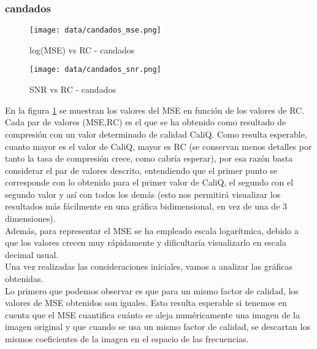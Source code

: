 \documentclass[12pt,a4paper]{article}
\begin{document}
\subsubsection{candados}
\hspace*{-2.5em}
\begin{minipage}{0.5\textwidth}
        \centering
        \begin{figure}[H]
        \centering
        \texttt{[image: data/candados\_mse.png]}
        \caption{log(MSE) vs RC - candados}
        \label{cand-mse}
        \end{figure}
        \end{minipage}\hfill
        \begin{minipage}{0.5\textwidth}
         \begin{figure}[H]
        \centering
        \texttt{[image: data/candados\_snr.png]}
        \caption{SNR vs RC - candados}
        \label{cand-snr}
        
        \end{figure}  
\end{minipage}

\vspace{2em}
En la figura \ref{cand-mse} se muestran los valores del MSE en función de los valores de RC. Cada par de valores (MSE,RC) es el que se ha obtenido como resultado de compresión con un valor determinado de calidad CaliQ. Como resulta esperable, cuanto mayor es el valor de CaliQ, mayor es RC (se conservan menos detalles por tanto la tasa de compresión crece, como cabría esperar), por esa razón basta considerar el par de valores descrito, entendiendo que el primer punto se corresponde con lo obtenido para el primer valor de CaliQ, el segundo con el segundo valor y así con todos los demás (esto nos permitirá visualizar los resultados más fácilmente en una gráfica bidimensional, en vez de una de 3 dimensiones).\\ 

Además, para representar el MSE se ha empleado escala logarítmica, debido a que los valores crecen muy rápidamente y dificultaría visualizarlo en escala decimal usual.\\

Una vez realizadas las consideraciones iniciales, vamos a analizar las gráficas obtenidas.\\

Lo primero que podemos observar es que para un mismo factor de calidad, los valores de MSE obtenidos son iguales. Esto resulta esperable si tenemos en cuenta que el MSE cuantifica cuánto se aleja numéricamente una imagen de la imagen original y que cuando se usa un mismo factor de calidad, se descartan los mismos coeficientes de la imagen en el espacio de las frecuencias.\\
\end{document}
